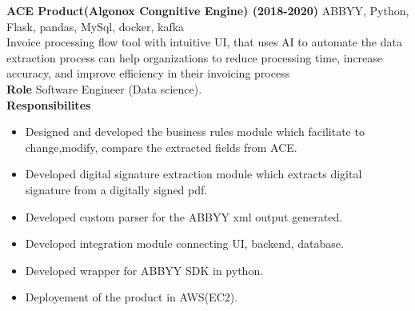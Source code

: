 \documentclass[a4paper]{article}
\begin{document}
{\textbf{ACE Product(Algonox Congnitive Engine) (2018-2020)}} {\hfill ABBYY, Python, Flask, pandas, MySql, docker, kafka} \\
\vspace*{1mm}
 Invoice processing flow tool with intuitive UI, that uses AI to automate the data extraction process can help organizations to reduce processing time, increase accuracy, and improve efficiency in their invoicing process\\
 \vspace*{2mm}
\textbf{Role}
Software Engineer (Data science).\\
\vspace*{1mm}
\textbf{Responsibilites} \\
\begin{itemize} \itemsep 1pt
	\item Designed and developed the business rules module which facilitate to change,modify, compare the extracted fields from ACE.
	\item Developed digital signature extraction module which extracts digital signature from a digitally signed pdf.
    \item Developed custom parser for the ABBYY xml output generated.   
    \item Developed integration module connecting UI, backend, database.
    \item Developed wrapper for ABBYY SDK in python.
    \item Deployement of the product in AWS(EC2).
\end{itemize}
\end{document}

